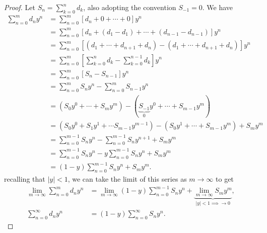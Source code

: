 \documentclass{article}
\theoremstyle{definition}
\begin{document}
\begin{proof}
		Let $ S_n = \sum_{k=0}^{n}d_k $, also adopting the convention  $ S_{-1}=0 $. We have 
		\begin{align*}
			\sum_{n=0}^{m}d_ny^n & = \sum_{n=0}^{m}\left[d_n + 0 + \cdots + 0\right]y^n \\
			& =  \sum_{n=0}^{m}\left[d_n + (d_1 - d_1) + \cdots + (d_{n-1} - d_{n-1})\right]y^n \\
			& =  \sum_{n=0}^{m}\left[(d_1 + \cdots + d_{n+1} + d_n)- (d_1 + \cdots + d_{n+1} + d_n)\right]y^n\\
			& =  \sum_{n=0}^{m}\left[\sum_{k=0}^{n}d_k - \sum_{k=0}^{n-1}d_k\right]y^n\\
			& =  \sum_{n=0}^{m}\left[S_n - S_{n-1}\right]y^n\\
			& =  \sum_{n=0}^{m}S_ny^n - \sum_{n=0}^{m}S_{n-1}y^n\\
			& =  \left(S_0y^0 + \cdots + S_my^m\right) - (\underbrace{S_{-1}}_0y^0 + \cdots + S_{m-1}y^m)\\
			&= \left(S_0y^0 + S_1y^1 + \cdots S_{m-1}y^{m-1} \right) - (S_0y^1+ \cdots + S_{m-1}y^m) + S_my^m\\ 
			&= \sum_{n=0}^{m-1}S_ny^n - \sum_{n=0}^{m-1}S_ny^{n+1} + S_my^m\\
			&= \sum_{n=0}^{m-1}S_ny^n - y\sum_{n=0}^{m-1}S_ny^{n} + S_my^m\\
			&= (1-y)\sum_{n=0}^{m-1}S_ny^n + S_my^m.
		\end{align*}
		recalling that $ |y|<1 $, we can take the limit of this series as $ m\to\infty $ to get 
		\begin{align*}
			\lim_{m\to \infty}	\sum_{n=0}^{m}d_ny^n &= \lim_{m\to \infty}(1-y)\sum_{n=0}^{m-1}S_ny^n +\underbrace{\lim_{m\to \infty} S_my^m}_{|y| < 1 \implies \to 0},\\
			\sum_{n=0}^{\infty}d_ny^n &= (1-y)\sum_{n=0}^{\infty}S_ny^n.
		\end{align*}
		

\end{proof}
\end{document}
